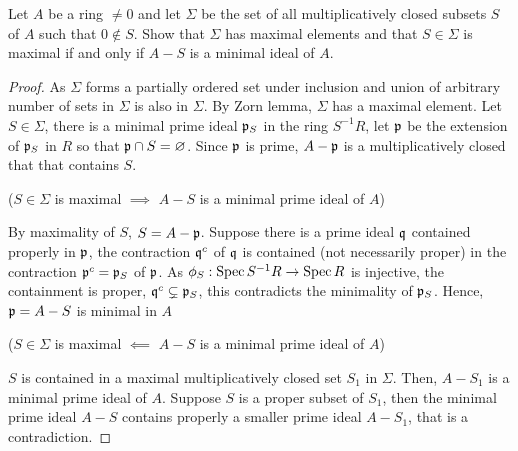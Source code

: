 \begin{problem}
	Let $A$ be a ring $\neq 0$ and let $\Sigma$ be the set of all multiplicatively closed subsets $S$ of $A$ such that $0 \notin S$. Show that $\Sigma$ has maximal elements and that $S \in \Sigma$ is maximal if and only if $A - S$ is a minimal ideal of $A$.
\end{problem}
\begin{proof}
	As $\Sigma$ forms a partially ordered set under inclusion and union of arbitrary number of sets in $\Sigma$ is also in $\Sigma$. By Zorn lemma, $\Sigma$ has a maximal element. Let $S \in \Sigma$, there is a minimal prime ideal $\mathfrak{p}_S$ in the ring $S^{-1} R$, let $\mathfrak{p}$ be the extension of $\mathfrak{p}_S$ in $R$ so that $\mathfrak{p} \cap S = \varnothing$. Since $\mathfrak{p}$ is prime, $A - \mathfrak{p}$ is a multiplicatively closed that that contains $S$.

	($S \in \Sigma$ is maximal $\implies$ $A - S$ is a minimal prime ideal of $A$)

	By maximality of $S$, $S = A - \mathfrak{p}$. Suppose there is a prime ideal $\mathfrak{q}$ contained properly in $\mathfrak{p}$, the contraction $\mathfrak{q}^c$ of $\mathfrak{q}$ is contained (not necessarily proper) in the contraction $\mathfrak{p}^c = \mathfrak{p}_S$ of $\mathfrak{p}$. As $\phi_S: \operatorname{Spec} S^{-1} R \to \operatorname{Spec} R$ is injective, the containment is proper, $\mathfrak{q}^c \subsetneq \mathfrak{p}_S$, this contradicts the minimality of $\mathfrak{p}_S$. Hence, $\mathfrak{p} = A - S$ is minimal in $A$
	
	($S \in \Sigma$ is maximal $\impliedby$ $A - S$ is a minimal prime ideal of $A$)
	
	$S$ is contained in a maximal multiplicatively closed set $S_1$ in $\Sigma$. Then, $A - S_1$ is a minimal prime ideal of $A$. Suppose $S$ is a proper subset of $S_1$, then the minimal prime ideal $A - S$ contains properly a smaller prime ideal $A - S_1$, that is a contradiction.
\end{proof}
